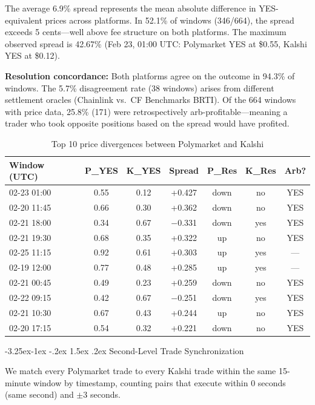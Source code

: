 \documentclass[11pt,a4paper]{article}
\makeatletter
\renewcommand\subsection{\@startsection{subsection}{2}{\z@}%
  {-3.25ex\@plus -1ex \@minus -.2ex}%
  {1.5ex \@plus .2ex}%
  {\normalfont\large\bfseries}}
\makeatother
\begin{document}
The average 6.9\% spread represents the mean absolute difference in YES-equivalent prices across platforms. In 52.1\% of windows (346/664), the spread exceeds 5 cents---well above fee structure on both platforms. The maximum observed spread is 42.67\% (Feb 23, 01:00 UTC: Polymarket YES at \$0.55, Kalshi YES at \$0.12).

\textbf{Resolution concordance:} Both platforms agree on the outcome in 94.3\% of windows. The 5.7\% disagreement rate (38 windows) arises from different settlement oracles (Chainlink vs.\ CF Benchmarks BRTI). Of the 664 windows with price data, 25.8\% (171) were retrospectively arb-profitable---meaning a trader who took opposite positions based on the spread would have profited.

\begin{table}[H]
\centering
\caption{Top 10 price divergences between Polymarket and Kalshi}
\label{tab:top_diverge}
\small
\begin{tabular}{@{}lcccccc@{}}
\toprule
\textbf{Window (UTC)} & \textbf{P\_YES} & \textbf{K\_YES} & \textbf{Spread} & \textbf{P\_Res} & \textbf{K\_Res} & \textbf{Arb?} \\
\midrule
02-23 01:00 & 0.55 & 0.12 & +0.427 & down & no & YES \\
02-20 11:45 & 0.66 & 0.30 & +0.362 & down & no & YES \\
02-21 18:00 & 0.34 & 0.67 & $-$0.331 & down & yes & YES \\
02-21 19:30 & 0.68 & 0.35 & +0.322 & up & no & YES \\
02-25 11:15 & 0.92 & 0.61 & +0.303 & up & yes & --- \\
02-19 12:00 & 0.77 & 0.48 & +0.285 & up & yes & --- \\
02-21 00:45 & 0.49 & 0.23 & +0.259 & down & no & YES \\
02-22 09:15 & 0.42 & 0.67 & $-$0.251 & down & yes & YES \\
02-21 10:30 & 0.67 & 0.43 & +0.244 & up & no & YES \\
02-20 17:15 & 0.54 & 0.32 & +0.221 & down & no & YES \\
\bottomrule
\end{tabular}
\end{table}

\subsection{Second-Level Trade Synchronization}

We match every Polymarket trade to every Kalshi trade within the same 15-minute window by timestamp, counting pairs that execute within 0 seconds (same second) and $\pm$3 seconds.
\end{document}

